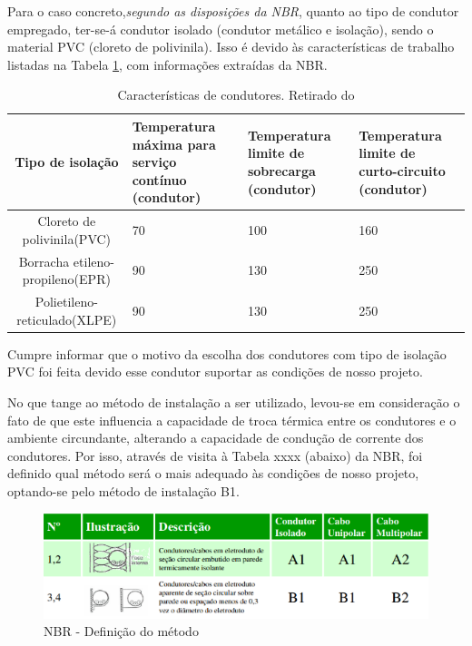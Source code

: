 Para o caso concreto,\textit{segundo as disposições da NBR}, quanto ao tipo de condutor empregado, ter-se-á condutor isolado (condutor metálico e isolação), sendo o material PVC (cloreto de polivinila). Isso é devido às características de trabalho listadas na Tabela \ref{nbr}, com informações extraídas da NBR.

\begin{table}[h]
\begin{tabular}{| c | p{3cm} | p{3cm} | p{3cm} |}
\hline
Tipo de isolação                & Temperatura máxima para serviço contínuo (condutor) & Temperatura limite de sobrecarga (condutor) & Temperatura limite de curto-circuito (condutor) \\ \hline
Cloreto de polivinila(PVC)      & 70                                                 & 100                                        & 160                                            \\ \hline
Borracha etileno-propileno(EPR) & 90                                                 & 130                                        & 250                                            \\ \hline
Polietileno-reticulado(XLPE)    & 90                                                 & 130                                        & 250                                           
\\ \hline
\end{tabular}
\label{nbr}
\caption{Características de condutores. Retirado do}
\end{table}

Cumpre informar que o motivo da escolha dos condutores com tipo de isolação PVC foi feita devido esse condutor suportar as condições de nosso projeto.

No que tange ao método de instalação a ser utilizado, levou-se em consideração o fato de que este influencia a capacidade de troca térmica entre os condutores e o ambiente circundante, alterando a capacidade de condução de corrente dos condutores. Por isso, através de visita à Tabela xxxx (abaixo) da NBR, foi definido qual método será o mais adequado às condições de nosso projeto, optando-se pelo método de instalação B1.

\begin{figure}[h]
	\centering
	\includegraphics[scale=0.8]		{figuras/nbr.png}
	\caption{NBR - Definição do método}
	\label{alternador}
\end{figure}


